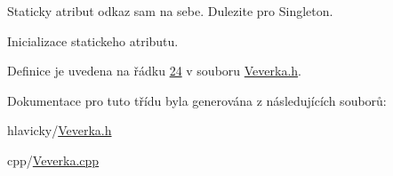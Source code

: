 Staticky atribut odkaz sam na sebe. Dulezite pro Singleton. 

Inicializace statickeho atributu. 

Definice je uvedena na řádku \hyperlink{Veverka_8h_source_l00024}{24} v souboru \hyperlink{Veverka_8h_source}{Veverka.\+h}.



Dokumentace pro tuto třídu byla generována z následujících souborů\+:\begin{DoxyCompactItemize}
\item 
hlavicky/\hyperlink{Veverka_8h}{Veverka.\+h}\item 
cpp/\hyperlink{Veverka_8cpp}{Veverka.\+cpp}\end{DoxyCompactItemize}
